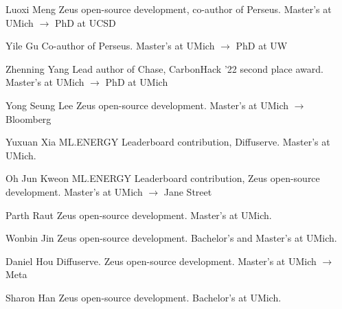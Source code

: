 

\begin{cvlist}

  \cvlistitem
    {Luoxi Meng}
    {Zeus open-source development, co-author of Perseus. Master's at UMich $\rightarrow$ PhD at UCSD}

  \cvlistitem
    {Yile Gu}
    {Co-author of Perseus. Master's at UMich $\rightarrow$ PhD at UW}

  \cvlistitem
    {Zhenning Yang}
    {Lead author of Chase, CarbonHack '22 second place award. Master's at UMich $\rightarrow$ PhD at UMich}

  \cvlistitem
    {Yong Seung Lee}
    {Zeus open-source development. Master's at UMich $\rightarrow$ Bloomberg}

  \cvlistitem
    {Yuxuan Xia}
    {ML.ENERGY Leaderboard contribution, Diffuserve. Master's at UMich.}

  \cvlistitem
    {Oh Jun Kweon}
    {ML.ENERGY Leaderboard contribution, Zeus open-source development. Master's at UMich $\rightarrow$ Jane Street}

  \cvlistitem
    {Parth Raut}
    {Zeus open-source development. Master's at UMich.}

  \cvlistitem
    {Wonbin Jin}
    {Zeus open-source development. Bachelor's and Master's at UMich.}

  \cvlistitem
    {Daniel Hou}
    {Diffuserve. Zeus open-source development. Master's at UMich $\rightarrow$ Meta}

  \cvlistitem
    {Sharon Han}
    {Zeus open-source development. Bachelor's at UMich.}

\end{cvlist}
